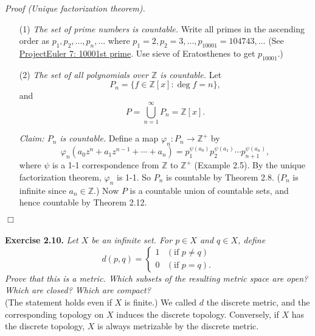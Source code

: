 \documentclass{article}
\begin{document}
\emph{Proof (Unique factorization theorem).}
\begin{enumerate}
\item[(1)]
\emph{The set of prime numbers is countable.}
Write all primes in the ascending order as $p_1, p_2, ..., p_n, ...$
where $p_1 = 2, p_2 = 3, ..., p_{10001} = 104743, ...$
(See \href{https://projecteuler.net/problem=7}{ProjectEuler 7: 10001st prime}.
Use sieve of Eratosthenes to get $p_{10001}$.)
\item[(2)]
\emph{The set of all polynomials over $\mathbb{Z}$ is countable.}
Let
$$P_n = \{ f \in \mathbb{Z}[x] : \deg f = n \},$$
and
$$P = \bigcup_{n = 1}^{\infty} P_n = \mathbb{Z}[x].$$

\emph{Claim: $P_n$ is countable.}
Define a map $\varphi_n: P_n \rightarrow \mathbb{Z}^+$ by
$$\varphi_n(a_0 z^n + a_1 z^{n-1} + \cdots + a_n)
= p_1^{\psi(a_0)} p_2^{\psi(a_1)} \cdots p_{n+1}^{\psi(a_n)},$$
where $\psi$ is a 1-1 correspondence from $\mathbb{Z}$ to $\mathbb{Z}^+$ (Example 2.5).
By the unique factorization theorem, $\varphi_n$ is 1-1.
So $P_n$ is countable by Theorem 2.8.
($P_n$ is infinite since $a_n \in \mathbb{Z}$.)
Now $P$ is a countable union of countable sets,
and hence countable by Theorem 2.12.
\end{enumerate}
$\Box$ \\\\



\textbf{Exercise 2.10.}
\emph{Let $X$ be an infinite set. For $p \in X$ and $q \in X$, define
\begin{equation*}
  d(p, q) =
    \begin{cases}
      1 & (\text{if } p \neq q) \\
      0 & (\text{if } p = q).
    \end{cases}
\end{equation*}
Prove that this is a metric.
Which subsets of the resulting metric space are open?
Which are closed?
Which are compact?} \\

(The statement holds even if $X$ is finite.)
We called $d$ the discrete metric,
and the corresponding topology on $X$ induces the discrete topology.
Conversely, if $X$ has the discrete topology, $X$ is always metrizable by the discrete metric. \\
\end{document}
